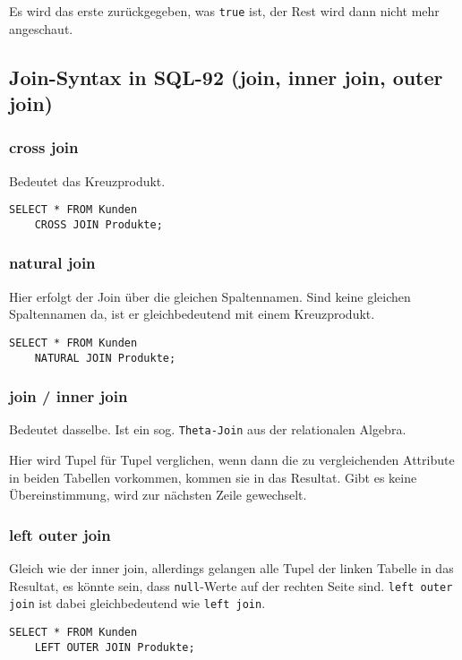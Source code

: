 Es wird das erste zurückgegeben, was \texttt{true} ist, der Rest wird dann nicht mehr angeschaut.

\subsection{Join-Syntax in SQL-92 (join, inner join, outer join)}

\subsubsection{cross join}
Bedeutet das Kreuzprodukt.
\begin{lstlisting}[caption={Cross Join}]
    SELECT * FROM Kunden
    CROSS JOIN Produkte;
\end{lstlisting}

\subsubsection{natural join}
Hier erfolgt der Join über die gleichen Spaltennamen. Sind keine gleichen Spaltennamen da, ist er gleichbedeutend mit einem Kreuzprodukt.
\begin{lstlisting}[caption={Natural Join}]
    SELECT * FROM Kunden
    NATURAL JOIN Produkte;
\end{lstlisting}

\subsubsection{join / inner join}
Bedeutet dasselbe. Ist ein sog. \texttt{Theta-Join} aus der relationalen Algebra.


Hier wird Tupel für Tupel verglichen, wenn dann die zu vergleichenden Attribute in beiden Tabellen vorkommen, kommen sie in das Resultat. Gibt es keine Übereinstimmung, wird zur nächsten Zeile gewechselt.


\subsubsection{left outer join}
Gleich wie der inner join, allerdings gelangen alle Tupel der linken Tabelle in das Resultat, es könnte sein, dass \texttt{null}-Werte auf der rechten Seite sind. \texttt{left outer join} ist dabei gleichbedeutend wie \texttt{left join}.

\begin{lstlisting}[caption={Left Join SQL}]
    SELECT * FROM Kunden
    LEFT OUTER JOIN Produkte;
\end{lstlisting}

